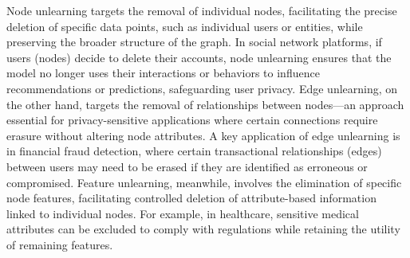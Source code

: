 Node unlearning targets the removal of individual nodes, facilitating the precise deletion of specific data points, such as individual users or entities, while preserving the broader structure of the graph. In social network platforms, if users (nodes) decide to delete their accounts, node unlearning ensures that the model no longer uses their interactions or behaviors to influence recommendations or predictions, safeguarding user privacy. Edge unlearning, on the other hand, targets the removal of relationships between nodes—an approach essential for privacy-sensitive applications where certain connections require erasure without altering node attributes. A key application of edge unlearning is in financial fraud detection, where certain transactional relationships (edges) between users may need to be erased if they are identified as erroneous or compromised. Feature unlearning, meanwhile, involves the elimination of specific node features, facilitating controlled deletion of attribute-based information linked to individual nodes. For example, in healthcare, sensitive medical attributes can be excluded to comply with regulations while retaining the utility of remaining features.


\vspace{-0.2cm}
